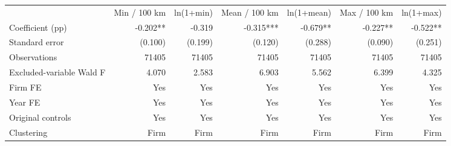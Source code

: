 \begin{tabular}{lrrrrrr}
\hline
 & Min / 100 km & ln(1+min) & Mean / 100 km & ln(1+mean) & Max / 100 km & ln(1+max) \\
Coefficient (pp) & -0.202** & -0.319 & -0.315*** & -0.679** & -0.227** & -0.522** \\
Standard error & (0.100) & (0.199) & (0.120) & (0.288) & (0.090) & (0.251) \\
Observations & 71405 & 71405 & 71405 & 71405 & 71405 & 71405 \\
Excluded-variable Wald F & 4.070 & 2.583 & 6.903 & 5.562 & 6.399 & 4.325 \\
Firm FE & Yes & Yes & Yes & Yes & Yes & Yes \\
Year FE & Yes & Yes & Yes & Yes & Yes & Yes \\
Original controls & Yes & Yes & Yes & Yes & Yes & Yes \\
Clustering & Firm & Firm & Firm & Firm & Firm & Firm \\
\hline
\end{tabular}
